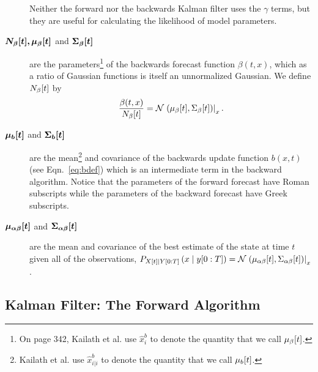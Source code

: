 \begin{description}
  Neither the forward nor the backwards Kalman filter uses the $\gamma$
  terms, but they are useful for calculating the likelihood of model
  parameters.
\item[$\bm{{N_\beta}{[t]},{\mu_\beta}{[t]}}$ and
  $\bm{{\Sigma_\beta}{[t]}}$] are the parameters\footnote{On page
    342, Kailath et al.\cite{KSH00} use $\hat x_i^b$ to denote the
    quantity that we call ${\mu_\beta}{[t]}$.} of the
  backwards forecast function $\beta(t,x)$, which as a ratio of
  Gaussian functions is itself an unnormalized Gaussian.  We define
  ${N_\beta}{[t]}$ by
  \begin{equation*}
    \frac{\beta(t,x)}{{N_\beta}{[t]}} =
    {\mathcal{N}}\left.\left({\mu_\beta}{[t]},{\Sigma_\beta}{[t]}\right)\right|_{x}.
  \end{equation*}
\item[$\bm{{\mu_b}{[t]}}$ and $\bm{{\Sigma_b}{[t]}}$] are the
  mean\footnote{Kailath et al.\cite{KSH00} use $\hat x_{i|i}^b$ to
    denote the quantity that we call ${\mu_b}{[t]}$.} and covariance
  of the backwards update function $b(x,t)$ (see Eqn.~\eqref{eq:bdef})
  which is an intermediate term in the backward algorithm.  Notice
  that the parameters of the forward forecast have Roman subscripts
  while the parameters of the backward forecast have Greek subscripts.
\item[$\bm{{\mu_{\alpha\beta}}{[t]}}$ and
  $\bm{{\Sigma_{\alpha\beta}}{[t]}}$] are the mean and covariance
  of the best estimate of the state at time $t$ given all of the
  observations, \ie $P_{{X}{[t]}\mid Y[0:T]} \left(x\mid y[0:T]
  \right) =
  {\mathcal{N}}\left.\left({\mu_{\alpha\beta}}{[t]},{\Sigma_{\alpha\beta}}{[t]}\right)\right|_{x}$.
\end{description}


\subsection{Kalman Filter: The Forward Algorithm}

